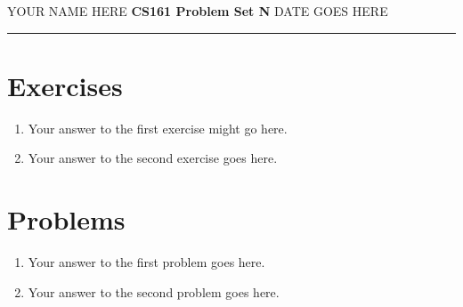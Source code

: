\documentclass{article}
\begin{document}
\noindent
YOUR NAME HERE \hfill \textbf{CS161 Problem Set N} \newline 
DATE GOES HERE 

\noindent
\rule{\linewidth}{0.4pt}


\section*{Exercises}

\begin{enumerate}

\item Your answer to the first exercise might go here.

\item Your answer to the second exercise goes here.

\end{enumerate}

\section*{Problems}

\begin{enumerate}

\item Your answer to the first problem goes here.

\item Your answer to the second problem goes here.

\end{enumerate}
\end{document}
